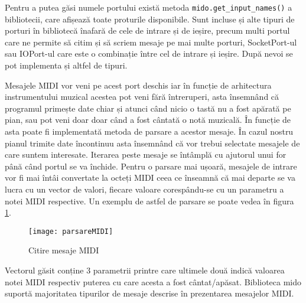 \documentclass[../IoMusT.tex]{subfiles}
\begin{document}
 Pentru a putea găsi numele portului există metoda \verb|mido.get_input_names()| a bibliotecii, care afișează toate proturile disponibile. Sunt incluse și alte tipuri de porturi în bibliotecă înafară de cele de intrare și de ieșire, precum multi portul care ne permite să citim și să scriem mesaje pe mai multe porturi, SocketPort-ul sau IOPort-ul care este o combinație între cel de intrare și ieșire. După nevoi se pot implementa și altfel de tipuri.
\\
\par Mesajele MIDI vor veni pe acest port deschis iar în funcție de arhitectura instrumentului muzical acestea pot veni fără întreruperi, asta însemnând că programul primește date chiar și atunci când nicio o tastă nu a fost apărată pe pian, sau pot veni doar doar când a fost cântată o notă muzicală. În funcție de asta poate fi implementată metoda de parsare a acestor mesaje. În cazul nostru pianul trimite date încontinuu asta însemnând că vor trebui selectate mesajele de care suntem interesate. Iterarea peste mesaje se întâmplă cu ajutorul unui for până când portul se va închide. Pentru o parsare mai ușoară, mesajele de intrare vor fi mai întâi convertate la octeți MIDI ceea ce înseamnă că mai departe se va lucra cu un vector de valori, fiecare valoare corespându-se cu un parametru a notei MIDI respective. Un exemplu de astfel de parsare se poate vedea în figura \ref{fig:midiPars}. 
\begin{figure}[h]
\centering
\texttt{[image: parsareMIDI]}
\caption{Citire mesaje MIDI}
\label{fig:midiPars}
\end{figure}
Vectorul găsit conține 3 parametrii printre care ultimele două indică valoarea notei MIDI respectiv puterea cu care acesta a fost cântat/apăsat. Biblioteca mido suportă majoritatea tipurilor de mesaje descrise în prezentarea mesajelor MIDI. 
\end{document}
